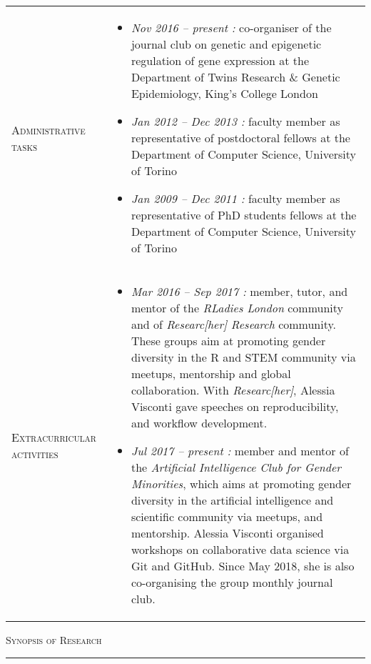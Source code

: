 \documentclass[a4paper,10pt]{article}
\newcommand{\mediumtitle}[1]{
	\vspace{0.2cm}
	{\noindent
	\Large \textsc{#1}\\[-2ex]
	\hrule
	\vspace{0.2cm}}
}
\newenvironment{doubletablelist}
{
	\vspace{-0.2cm}
	\begin{longtable}[!h]{AB}}{\end{longtable}
}
\newcommand{\dtlist}[2]{
\hspace{-3cm}
\noindent
	\begin{minipage}{0.24\textwidth}
	\begin{flushright}
	\textsc{#1}
	\end{flushright}
	\end{minipage}
	& #2\\[0.2cm]
}
\newcommand{\minusitem}{\item[-]}
\begin{document}
\begin{doubletablelist}

\dtlist{Administrative tasks}{
	\vspace{-0.6cm}
	\begin{itemize}[itemsep=-0.5ex]
		\minusitem  \emph{Nov 2016 -- present : } co-organiser of the journal club on genetic and epigenetic regulation of gene expression at the Department of Twins Research \& Genetic Epidemiology, King's College London
		\minusitem  \emph{Jan 2012 -- Dec 2013 : } faculty member as representative of postdoctoral fellows at the Department of Computer Science, University of Torino
		\minusitem  \emph{Jan 2009 -- Dec 2011 : } faculty member as representative of PhD students fellows at the Department of Computer Science, University of Torino
	\end{itemize}
}


\dtlist{Extracurricular activities}{
	\vspace{-0.9cm}
	\begin{itemize}[itemsep=-0.5ex]
		\minusitem  \emph{Mar 2016 -- Sep 2017 : } member, tutor, and mentor of the \emph{RLadies London} community and of \emph{Researc[her] Research} community. These groups aim at promoting gender diversity in the R and STEM community via meetups, mentorship and global collaboration. With \emph{Researc[her]}, Alessia Visconti gave speeches on reproducibility, and workflow development. 
		\minusitem \emph{Jul 2017 -- present : } member and mentor of the \emph{Artificial Intelligence Club for Gender Minorities}, which aims at promoting gender diversity in the artificial intelligence and scientific community via meetups, and mentorship. Alessia Visconti organised workshops on collaborative data science via Git and GitHub. Since May 2018, she is also co-organising the group monthly journal club.
	\end{itemize}
}


\end{doubletablelist}

\newpage


\mediumtitle{Synopsis of Research}
\end{document}
